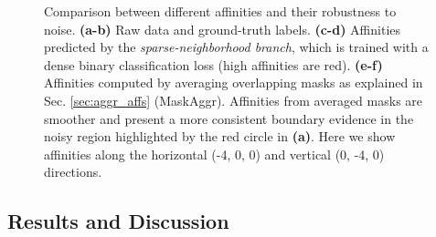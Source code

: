 \begin{figure}[t]
\caption{Comparison between different affinities and their robustness to noise. \textbf{\mbox{(a-b)}} Raw data and ground-truth labels. \textbf{(c-d)} Affinities predicted by the \emph{sparse-neighborhood branch}, which is trained with a dense binary classification loss (high affinities are red). \textbf{(e-f)} Affinities computed by averaging overlapping masks as explained in Sec. \ref{sec:aggr_affs} (MaskAggr). Affinities from averaged masks are smoother and present a more consistent boundary evidence in the noisy region highlighted by the red circle in \textbf{(a)}. Here we show affinities along the horizontal (-4, 0, 0) and vertical (0, -4, 0) directions.}\label{fig:affs_comparison}
\end{figure}

\subsection{Results and Discussion}

